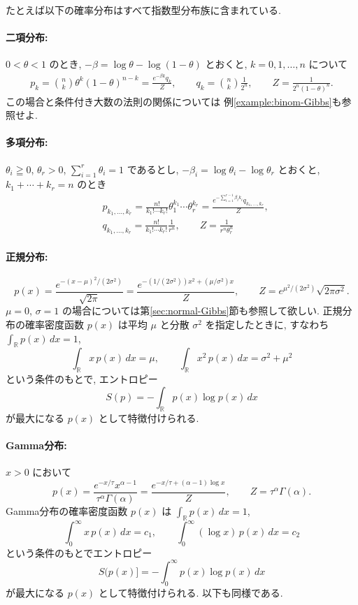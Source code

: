 \documentclass[12pt,twoside]{jarticle}
\newcommand\R{{\mathbb R}} %
\theoremstyle{jplain}
\theoremstyle{jplain}
\theoremstyle{jplain}
\numberwithin{theorem}{section}
\numberwithin{equation}{section}
\numberwithin{figure}{section}
\numberwithin{table}{section}
\newcommand\secref[1]{第\ref{#1}節}
\newcommand\exampleref[1]{例\ref{#1}}
\begin{document}
たとえば以下の確率分布はすべて指数型分布族に含まれている.

\paragraph{二項分布:} $0<\theta<1$ のとき,
$-\beta=\log\theta-\log(1-\theta)$ とおくと, $k=0,1,\ldots,n$ について
\begin{align*}
p_k 
= \binom{n}{k} \theta^k(1-\theta)^{n-k}
=\frac{e^{-\beta k}q_k}{Z},
\qquad
q_k = \binom{n}{k}\frac{1}{2^n}, 
\qquad
Z = \frac{1}{2^n(1-\theta)^n}.
\end{align*}
この場合と条件付き大数の法則の関係については
\exampleref{example:binom-Gibbs}も参照せよ.

\paragraph{多項分布:} $\theta_i\geqq 0$, $\theta_r>0$, $\sum_{i=1}^r\theta_i=1$ であるとし, 
$-\beta_i=\log\theta_i-\log\theta_r$ とおくと, \\
$k_1+\cdots+k_r=n$ のとき
\begin{align*}
&
p_{k_1,\ldots,k_r}
=
\frac{n!}{k_1!\cdots k_r!}\theta_1^{k_1}\cdots \theta_r^{k_r}
=\frac{e^{-\sum_{i=1}^{r-1}\beta_i k_i}q_{k_1,\ldots,k_r}}{Z},
\\ &
q_{k_1,\ldots,k_r}
=\frac{n!}{k_1!\cdots k_r!}\frac{1}{r^n},
\qquad
Z=\frac{1}{r^n\theta_r^n}
\end{align*}

\paragraph{正規分布:}
\[
p(x) 
= \frac{e^{-(x-\mu)^2/(2\sigma^2)}}{\sqrt{2\pi}}
= \frac{e^{-(1/(2\sigma^2))x^2+(\mu/\sigma^2)x}}{Z},
\qquad Z=e^{\mu^2/(2\sigma^2)}\sqrt{2\pi\sigma^2}.
\]
$\mu=0$, $\sigma=1$ の場合については\secref{sec:normal-Gibbs}も参照して欲しい.
正規分布の確率密度函数 $p(x)$ は平均 $\mu$ と分散 $\sigma^2$ を指定したときに, 
すなわち $\int_\R p(x)\,dx=1$, 
\[
\int_\R x\,p(x)\,dx=\mu, \qquad
\int_\R x^2\,p(x)\,dx = \sigma^2+\mu^2
\]
という条件のもとで, エントロピー
\[
S(p) = -\int_\R p(x)\log p(x)\,dx
\]
が最大になる $p(x)$ として特徴付けられる.

\paragraph{Gamma分布:} $x>0$ において
\[
p(x)=\frac{e^{-x/\tau}x^{\alpha-1}}{\tau^{\alpha}\Gamma(\alpha)}
=\frac{e^{-x/\tau+(\alpha-1)\log x}}{Z}, 
\qquad
Z=\tau^{\alpha}\Gamma(\alpha).
\]
Gamma分布の確率密度函数 $p(x)$ は $\int_\R p(x)\,dx=1$, 
\[
\int_0^\infty x\,p(x)\,dx=c_1, \qquad
\int_0^\infty (\log x)\, p(x)\,dx = c_2
\]
という条件のもとでエントロピー
\[
S(p(x)] = - \int_0^\infty p(x)\log p(x)\,dx
\]
が最大になる $p(x)$ として特徴付けられる. 以下も同様である.
\end{document}
